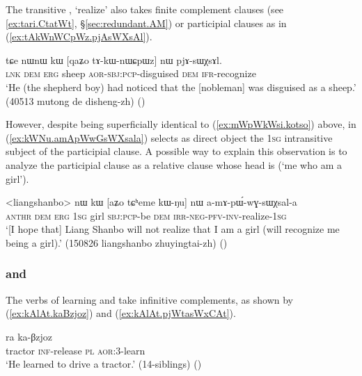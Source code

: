 The transitive  , `realize' also takes finite complement clauses  (see \ref{ex:tari.CtatWt}, §\ref{sec:redundant.AM}) or participial clauses as in (\ref{ex:tAkWnWCpWz.pjAsWXsAl}).

\begin{exe}
\ex \label{ex:tAkWnWCpWz.pjAsWXsAl}
 \gll tɕe nɯnɯ kɯ [qaʑo tɤ-kɯ-nɯɕpɯz] nɯ pjɤ-sɯχsɤl. \\
 \textsc{lnk} \textsc{dem} \textsc{erg} sheep \textsc{aor}-\textsc{sbj}:\textsc{pcp}-disguised \textsc{dem} \textsc{ifr}-recognize \\
\glt `He (the shepherd boy) had noticed that the [nobleman] was disguised as a sheep.' (40513 mutong de disheng-zh)
()
\end{exe}

However, despite being superficially identical to (\ref{ex:mWpWkWsi.kotso}) above, in (\ref{ex:kWNu.amApWwGsWXsala})  selects as direct object the \textsc{1sg}  intransitive subject  of the participial clause. A possible way to explain this observation is to analyze the participial clause  as a relative clause whose head is   (`me who am a girl').
 
\begin{exe}
\ex \label{ex:kWNu.amApWwGsWXsala}
 \gll <liangshanbo> nɯ kɯ [aʑo tɕʰeme kɯ-ŋu] nɯ a-mɤ-pɯ́-wɣ-sɯχsal-a \\
  \textsc{anthr} \textsc{dem} \textsc{erg} \textsc{1sg} girl \textsc{sbj}:\textsc{pcp}-be \textsc{dem} \textsc{irr}-\textsc{neg}-\textsc{pfv}-\textsc{inv}-realize-\textsc{1sg} \\
 \glt `[I hope that] Liang Shanbo will not realize that I am a girl (will recognize me being a girl).' (150826 liangshanbo zhuyingtai-zh)
()
 \end{exe}

 
 \subsubsection{ and } \label{sec:Bzjoz.sWxCAt.complement}
 The verbs of learning  and  take infinitive complements, as shown by (\ref{ex:kAlAt.kaBzjoz}) and (\ref{ex:kAlAt.pjWtasWxCAt}).
 
\begin{exe}
\ex \label{ex:kAlAt.kaBzjoz}
  ra ka-βzjoz \\
 tractor \textsc{inf}-release \textsc{pl} \textsc{aor}:3\flobv{}-learn \\
 \glt  `He learned to drive a tractor.' (14-siblings)
 ()
 \end{exe}

